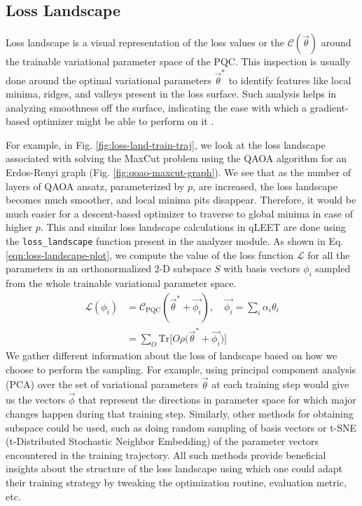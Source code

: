 \subsection{Loss Landscape}

Loss landscape is a visual representation of the loss values or the $\mathcal{C}(\vec{\theta})$ around the trainable variational parameter space of the PQC. This inspection is usually done around the optimal variational parameters $\vec{\theta}^{*}$ to identify features like local minima, ridges, and valleys present in the loss surface. Such analysis helps in analyzing smoothness off the surface, indicating the ease with which a gradient-based optimizer might be able to perform on it \cite{loss-landscapes}. 

For example, in Fig. \ref{fig:loss-land-train-traj}, we look at the loss landscape associated with solving the MaxCut problem using the QAOA algorithm \cite{2014arXiv1411.4028F} for an Erdos-Renyi graph (Fig. \ref{fig:qoao-maxcut-graph}). We see that as the number of layers of QAOA ansatz, parameterized by $p$, are increased, the loss landscape becomes much smoother, and local minima pits disappear. Therefore, it would be much easier for a descent-based optimizer to traverse to global minima in case of higher $p$. This and similar loss landscape calculations in qLEET are done using the \texttt{loss\_landscape} function present in the analyzer module. As shown in Eq. \ref{eqn:loss-landscape-plot}, we compute the value of the loss function $\mathcal{L}$ for all the parameters in an orthonormalized 2-D subspace $S$ with basis vectors $\phi_i$ sampled from the whole trainable variational parameter space. 
\begin{equation}\label{eqn:loss-landscape-plot}
    \begin{split}
        \mathcal{L}(\phi_i) 
        &= \mathcal{C}_{\text{PQC}}(\vec{\theta}^* + \vec{\phi_i}), \quad \vec{\phi_i} = \sum_i \alpha_i \theta_i\\ 
        &= \sum_{O} \text{Tr}\Bigg[O\rho \bigg(\vec{\theta}^* + \vec{\phi_i} \bigg) \Bigg]
    \end{split}
\end{equation}
We gather different information about the loss of landscape based on how we choose to perform the sampling. For example, using principal component analysis (PCA) over the set of variational parameters $\vec{\theta}$ at each training step would give us the vectors $\vec{\phi}$ that represent the directions in parameter space for which major changes happen during that training step. Similarly, other methods for obtaining subspace could be used, such as doing random sampling of basis vectors or t-SNE (t-Distributed Stochastic Neighbor Embedding) of the parameter vectors encountered in the training trajectory. All such methods provide beneficial insights about the structure of the loss landscape using which one could adapt their training strategy by tweaking the optimization routine, evaluation metric, etc. 

